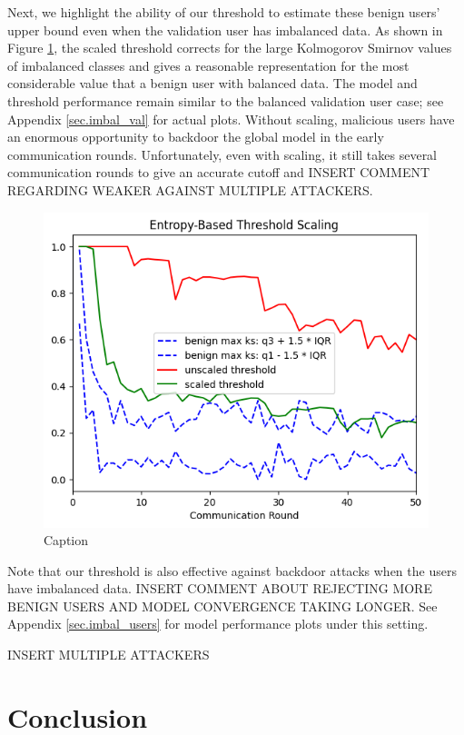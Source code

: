 \documentclass{article} %
\begin{document}
Next, we highlight the ability of our threshold to estimate these benign users' upper bound even when the validation user has imbalanced data. As shown in Figure \ref{fig:centralized--alpha10000--alpha_val1--scaling--d_rounds50.png}, the scaled threshold corrects for the large Kolmogorov Smirnov values of imbalanced classes and gives a reasonable representation for the most considerable value that a benign user with balanced data. The model and threshold performance remain similar to the balanced validation user case; see Appendix \ref{sec.imbal_val} for actual plots. Without scaling, malicious users have an enormous opportunity to backdoor the global model in the early communication rounds. Unfortunately, even with scaling, it still takes several communication rounds to give an accurate cutoff and INSERT COMMENT REGARDING WEAKER AGAINST MULTIPLE ATTACKERS.

\begin{figure}[H]
    \centering
    \includegraphics[width=.5\textwidth]{01_trusted/centralized/alpha10000--alpha_val1/visuals/scaling--n_malicious1--m_start1--d_rounds50.png}
    \caption{Caption}
    \label{fig:centralized--alpha10000--alpha_val1--scaling--d_rounds50.png}
\end{figure}

Note that our threshold is also effective against backdoor attacks when the users have imbalanced data. INSERT COMMENT ABOUT REJECTING MORE BENIGN USERS AND MODEL CONVERGENCE TAKING LONGER. See Appendix \ref{sec.imbal_users} for model performance plots under this setting.

INSERT MULTIPLE ATTACKERS

% 
\section{Conclusion}

%



%
\appendix
\end{document}
